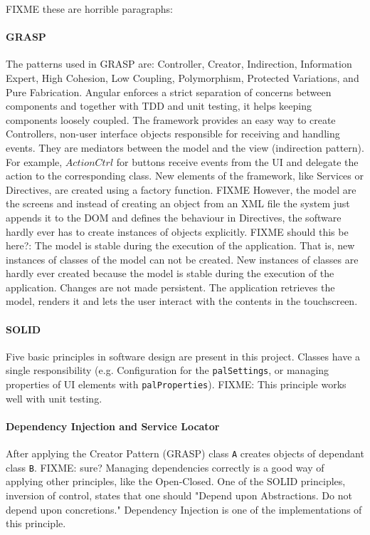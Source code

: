  FIXME these are horrible paragraphs:
\paragraph{\ac{GRASP}} The patterns used in \ac{GRASP} are: Controller, Creator, Indirection, Information Expert, High Cohesion, Low Coupling, Polymorphism, Protected Variations, and Pure Fabrication. 
Angular enforces a strict separation of concerns between components and together with \ac{TDD} and unit testing, it helps keeping components loosely coupled.
The framework provides an easy way to create Controllers, non-user interface objects responsible for receiving and handling events.
They are mediators between the model and the view (indirection pattern). 
For example, $ActionCtrl$ for buttons receive events from the \ac{UI} and delegate the action to the corresponding class.
New elements of the framework, like Services or Directives, are created using a factory function.
FIXME However, the model are the screens and instead of creating an object from an \ac{XML} file the system just appends it to the \ac{DOM} and defines the behaviour in Directives, the software hardly ever has to create instances of objects explicitly.
FIXME should this be here?: The model is stable during the execution of the application. That is, new instances of classes of the model can not be created. 
New instances of classes are hardly ever created because the model is stable during the execution of the application. 
Changes are not made persistent. 
The application retrieves the model, renders it and lets the user interact with the contents in the touchscreen.

\paragraph{\ac{SOLID}} Five basic principles in software design are present in this project.
Classes have a single responsibility (e.g. Configuration for the \texttt{palSettings}, or managing properties of \ac{UI} elements with \texttt{palProperties}). 
FIXME: This principle works well with unit testing.


\paragraph{Dependency Injection and Service Locator} 
After applying the Creator Pattern (\ac{GRASP}) class \texttt{A} creates objects of dependant class \texttt{B}.
FIXME: sure? Managing dependencies correctly is a good way of applying other principles, like the Open-Closed.
One of the \ac{SOLID} principles, inversion of control, states that one should "Depend upon Abstractions. Do not depend upon concretions."
Dependency Injection is one of the implementations of this principle.

